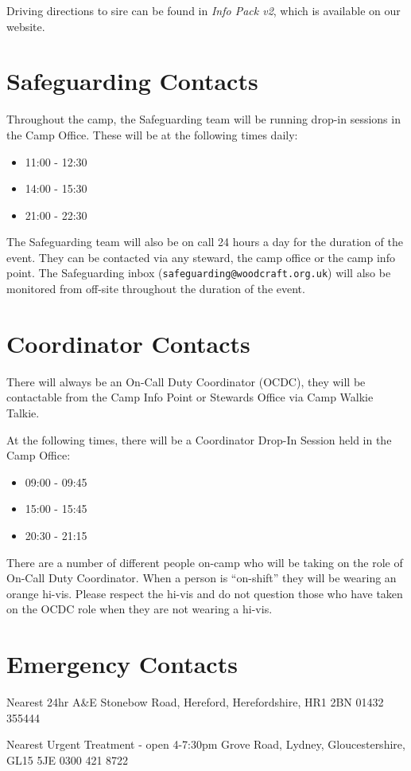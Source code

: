 \documentclass[a4paper, 11pt]{report}
\begin{document}
Driving directions to sire can be found in \textit{Info Pack v2}, which is available on our website. 

\section{Safeguarding Contacts}
Throughout the camp, the Safeguarding team will be running drop-in sessions in the Camp Office. These will be at the following times daily:
\begin{itemize}
    \item 11:00 - 12:30
    \item 14:00 - 15:30
    \item 21:00 - 22:30
\end{itemize}
The Safeguarding team will also be on call 24 hours a day for the duration of the event. They can be contacted via any steward, the camp office or the camp info point. The Safeguarding inbox (\texttt{safeguarding@woodcraft.org.uk}) will also be monitored from off-site throughout the duration of the event.

\section{Coordinator Contacts}
There will always be an On-Call Duty Coordinator (OCDC), they will be contactable from the Camp Info Point or Stewards Office via Camp Walkie Talkie.\nl

At the following times, there will be a Coordinator Drop-In Session held in the Camp Office:
\begin{itemize}
    \item 09:00 - 09:45
    \item 15:00 - 15:45
    \item 20:30 - 21:15
\end{itemize}
There are a number of different people on-camp who will be taking on the role of On-Call Duty Coordinator. When a person is ``on-shift'' they will be wearing an orange hi-vis. Please respect the hi-vis and do not question those who have taken on the OCDC role when they are not wearing a hi-vis. 

\section{Emergency Contacts}
Nearest 24hr A\&E Stonebow Road, Hereford, Herefordshire, HR1 2BN 01432 355444\nl

Nearest Urgent Treatment - open 4-7:30pm Grove Road, Lydney, Gloucestershire, GL15 5JE 0300 421 8722\nl
\end{document}
